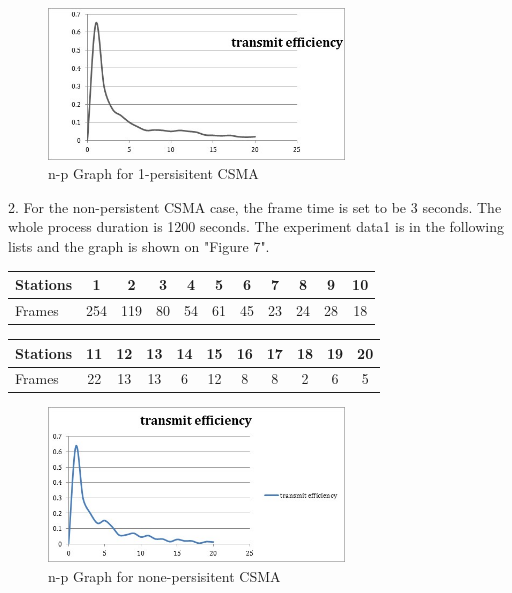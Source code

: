 \documentclass[11pt,a4paper]{report}
\begin{document}
\begin{figure}
\centering
\includegraphics[width=0.7\textwidth]{3_2.jpg}
\caption{n-p Graph for 1-persisitent CSMA}
\end{figure}

2. For the non-persistent CSMA case, the frame time is set to be 3 seconds. The whole process duration is 1200 seconds. The experiment data1 is in the following lists and the graph is shown on "Figure 7".
\begin{table}[htbp]
\begin{tabular}{lcccccccccc}
\toprule
Stations & 1 & 2 & 3 & 4 & 5 & 6 & 7 & 8 & 9 & 10 \\
\midrule
Frames & 254 & 119 & 80 & 54 & 61 & 45 & 23 & 24 & 28 & 18 \\
\bottomrule
\end{tabular}
\end{table}

\begin{table}[htbp]
\begin{tabular}{lcccccccccc}
\toprule
Stations & 11 & 12 & 13  & 14 & 15 & 16 & 17 & 18 & 19 & 20 \\
\midrule
Frames & 22 & 13 & 13 & 6 & 12 & 8 & 8 & 2 & 6 & 5 \\
\bottomrule
\end{tabular}
\end{table}

\begin{figure}
\centering
\includegraphics[width=0.7\textwidth]{3_3.jpg}
\caption{n-p Graph for none-persisitent CSMA}
\end{figure}
\end{document}
